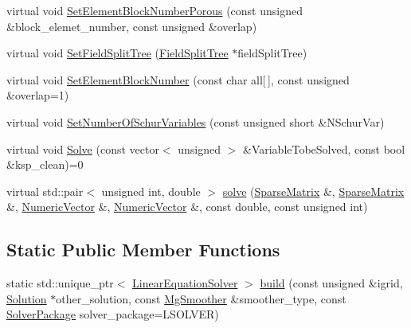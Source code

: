 \begin{DoxyCompactItemize}
\item 
virtual void \mbox{\hyperlink{classfemus_1_1_linear_equation_solver_a7cfb02af590c30fe0437ee89aed2daf7}{Set\+Element\+Block\+Number\+Porous}} (const unsigned \&block\+\_\+elemet\+\_\+number, const unsigned \&overlap)
\item 
virtual void \mbox{\hyperlink{classfemus_1_1_linear_equation_solver_a62683a501b58f6bbda90f7b1d15b1f5a}{Set\+Field\+Split\+Tree}} (\mbox{\hyperlink{classfemus_1_1_field_split_tree}{Field\+Split\+Tree}} $\ast$field\+Split\+Tree)
\item 
virtual void \mbox{\hyperlink{classfemus_1_1_linear_equation_solver_aa54d0fc18a6ca183b89d038495a7f8f1}{Set\+Element\+Block\+Number}} (const char all\mbox{[}$\,$\mbox{]}, const unsigned \&overlap=1)
\item 
virtual void \mbox{\hyperlink{classfemus_1_1_linear_equation_solver_a09c6e1700ba25b46e3195ea2f7a602c5}{Set\+Number\+Of\+Schur\+Variables}} (const unsigned short \&N\+Schur\+Var)
\item 
virtual void \mbox{\hyperlink{classfemus_1_1_linear_equation_solver_a3aeb1128e40d67fbdc16924b051696a3}{Solve}} (const vector$<$ unsigned $>$ \&Variable\+Tobe\+Solved, const bool \&ksp\+\_\+clean)=0
\item 
virtual std\+::pair$<$ unsigned int, double $>$ \mbox{\hyperlink{classfemus_1_1_linear_equation_solver_a94ec3fe3a98e1201c3f192a86a249ce5}{solve}} (\mbox{\hyperlink{classfemus_1_1_sparse_matrix}{Sparse\+Matrix}} \&, \mbox{\hyperlink{classfemus_1_1_sparse_matrix}{Sparse\+Matrix}} \&, \mbox{\hyperlink{classfemus_1_1_numeric_vector}{Numeric\+Vector}} \&, \mbox{\hyperlink{classfemus_1_1_numeric_vector}{Numeric\+Vector}} \&, const double, const unsigned int)
\end{DoxyCompactItemize}
\subsection*{Static Public Member Functions}
\begin{DoxyCompactItemize}
\item 
static std\+::unique\+\_\+ptr$<$ \mbox{\hyperlink{classfemus_1_1_linear_equation_solver}{Linear\+Equation\+Solver}} $>$ \mbox{\hyperlink{classfemus_1_1_linear_equation_solver_a1c5462b2be3a908d75ea73e8ab222216}{build}} (const unsigned \&igrid, \mbox{\hyperlink{classfemus_1_1_solution}{Solution}} $\ast$other\+\_\+solution, const \mbox{\hyperlink{_mg_smoother_enum_8hpp_a4d11c2ff93e2f0f440c879a9c40cda71}{Mg\+Smoother}} \&smoother\+\_\+type, const \mbox{\hyperlink{_solver_package_enum_8hpp_a32541e934c944770722653e69abe38fe}{Solver\+Package}} solver\+\_\+package=L\+S\+O\+L\+V\+ER)
\end{DoxyCompactItemize}
